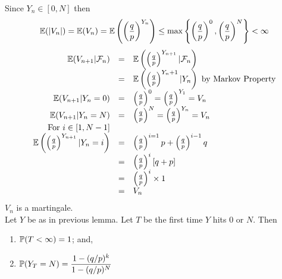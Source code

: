 \documentclass[11pt,a4paper]{article}
\begin{document}
Since $Y_n\in[0,N]$ then
$$\mathbb{E}(|V_n|)=\mathbb{E}(V_n)=\mathbb{E}\left(\left(\frac{q}{p}\right)^{Y_n}\right)\leq\max\left\{\left(\frac{q}{p}\right)^0,\left(\frac{q}{p}\right)^N\right\}<\infty$$
\[\begin{array}{rcl}
\expect(V_{n+1}|\mathcal{F}_n)&=&\expect\left(\left(\frac{q}{p}\right)^{Y_{n+1}}|\mathcal{F}_n\right)\\
&=&\expect\left(\left(\frac{q}{p}\right)^{Y_n+1}|Y_n\right)\mathrm{\ by\ Markov\ Property}\\
\expect(V_{n+1}|Y_n=0)&=&\left(\frac{q}{p}\right)^0=\left(\frac{q}{p}\right)^{Y_1}=V_n\\
\expect(V_{n+1}|Y_n=N)&=&\left(\frac{q}{p}\right)^N=\left(\frac{q}{p}\right)^{Y_n}=V_n\\
\mathrm{For}\ i\in[1,N-1]\\
\expect\left(\left(\frac{q}{p}\right)^{Y_{n+1}}|Y_n=i\right)&=&\left(\frac{q}{p}\right)^{i=1}p+\left(\frac{q}{p}\right)^{i-1}q\\
&=&\left(\frac{q}{p}\right)^i[q+p]\\
&=&\left(\frac{q}{p}\right)^i\times1\\
&=&V_n
\end{array}\]
$V_n$ is a martingale.\\

Let $Y$ be as in previous lemma. Let $T$ be the first time $Y$ hits $0$ or $N$. Then
\begin{enumerate}
	\item $\mathbb{P}(T<\infty)=1$; and,
	\item $\mathbb{P}(Y_T=N)=\dfrac{1-(q/p)^k}{1-(q/p)^N}$
\end{enumerate}
\end{document}
